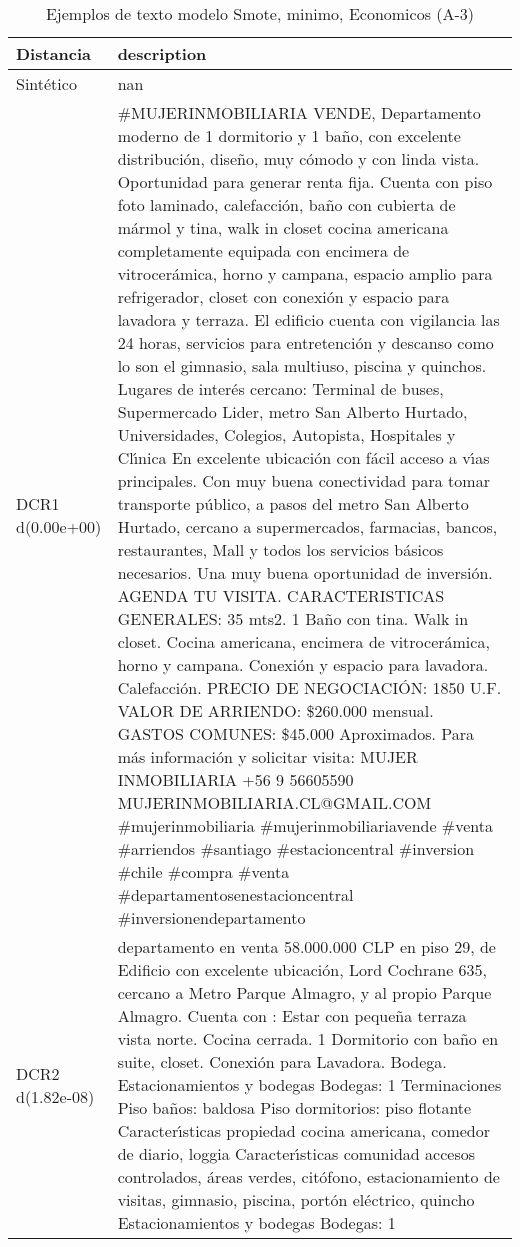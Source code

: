 \begin{table}[H]
\centering
\fontsize{10}{14}\selectfont
\caption{Ejemplos de texto modelo Smote, minimo, Economicos (A-3)}
\label{table-example-economicos-a-3-smote-enc-min-text}
\begin{tabular}{|l|m{35em}|}
\hline
\rowcolor[gray]{0.8}
Distancia & description \\
\hline Sintético & nan \\
\hline DCR1 d(0.00e+00) & \#MUJERINMOBILIARIA VENDE, Departamento moderno de 1 dormitorio y 1 ba\~no, con excelente distribuci\'on, dise\~no, muy c\'omodo y con linda vista. Oportunidad para generar renta fija.  Cuenta con piso foto laminado, calefacci\'on, ba\~no con cubierta de m\'armol y tina, walk in closet cocina americana completamente equipada con encimera de vitrocer\'amica, horno y campana, espacio amplio para refrigerador, closet con conexi\'on y espacio para lavadora y terraza.  El edificio cuenta con vigilancia las 24 horas, servicios para entretenci\'on y descanso como lo son el gimnasio, sala multiuso, piscina y quinchos.  Lugares de inter\'es cercano: Terminal de buses, Supermercado Lider, metro San Alberto Hurtado, Universidades, Colegios, Autopista, Hospitales y Cl{\'\i}nica  En excelente ubicaci\'on con f\'acil acceso a v{\'\i}as principales. Con muy buena conectividad para tomar transporte p\'ublico, a pasos del metro San Alberto Hurtado, cercano a supermercados, farmacias, bancos, restaurantes, Mall y todos los servicios b\'asicos necesarios.  Una muy buena oportunidad de inversi\'on. AGENDA TU VISITA.  CARACTERISTICAS GENERALES: 35 mts2. 1 Ba\~no con tina. Walk in closet. Cocina americana, encimera de vitrocer\'amica, horno y campana. Conexi\'on y espacio para lavadora. Calefacci\'on.  PRECIO DE NEGOCIACI\'ON: 1850 U.F. VALOR DE ARRIENDO: \$260.000 mensual. GASTOS COMUNES: \$45.000 Aproximados.  Para m\'as informaci\'on y solicitar visita: MUJER INMOBILIARIA +56 9 56605590  MUJERINMOBILIARIA.CL@GMAIL.COM  \#mujerinmobiliaria \#mujerinmobiliariavende \#venta \#arriendos \#santiago \#estacioncentral \#inversion \#chile \#compra \#venta \#departamentosenestacioncentral \#inversionendepartamento \\
\hline DCR2 d(1.82e-08) & departamento en venta 58.000.000 CLP en piso 29, de Edificio con excelente ubicaci\'on, Lord Cochrane 635, cercano a Metro Parque Almagro, y al propio Parque Almagro. Cuenta con : Estar con peque\~na terraza vista norte. Cocina cerrada. 1 Dormitorio con ba\~no en suite, closet. Conexi\'on para Lavadora. Bodega.  Estacionamientos y bodegas Bodegas: 1    Terminaciones  Piso ba\~nos: baldosa Piso dormitorios: piso flotante  Caracter{\'\i}sticas propiedad  cocina americana, comedor de diario, loggia  Caracter{\'\i}sticas comunidad  accesos controlados, \'areas verdes, cit\'ofono, estacionamiento de visitas, gimnasio, piscina, port\'on el\'ectrico, quincho  Estacionamientos y bodegas   Bodegas: 1 \\
\hline
\end{tabular}
\end{table}
